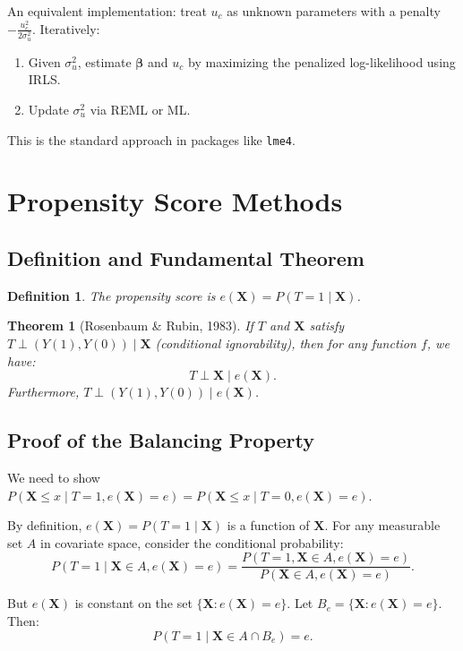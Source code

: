\documentclass[12pt]{article}
\numberwithin{equation}{section}
\newtheorem{theorem}{Theorem}[section]
\newtheorem{definition}{Definition}[section]
\begin{document}
	An equivalent implementation: treat $u_c$ as unknown parameters with a penalty $-\frac{u_c^2}{2\sigma_u^2}$. Iteratively:
	\begin{enumerate}
		\item Given $\sigma_u^2$, estimate $\boldsymbol{\beta}$ and $u_c$ by maximizing the penalized log-likelihood using IRLS.
		\item Update $\sigma_u^2$ via REML or ML.
	\end{enumerate}
	
	This is the standard approach in packages like \texttt{lme4}.
	
	\section{Propensity Score Methods}
	
	\subsection{Definition and Fundamental Theorem}
	
	\begin{definition}
		The propensity score is $e(\mathbf{X}) = P(T=1 \mid \mathbf{X})$.
	\end{definition}
	
	\begin{theorem}[Rosenbaum \& Rubin, 1983]
		If $T$ and $\mathbf{X}$ satisfy $T \perp (Y(1), Y(0)) \mid \mathbf{X}$ (conditional ignorability), then for any function $f$, we have:
		\[
		T \perp \mathbf{X} \mid e(\mathbf{X}).
		\]
		Furthermore, $T \perp (Y(1), Y(0)) \mid e(\mathbf{X})$.
	\end{theorem}
	
	\subsection{Proof of the Balancing Property}
	
	We need to show $P(\mathbf{X} \le x \mid T=1, e(\mathbf{X})=e) = P(\mathbf{X} \le x \mid T=0, e(\mathbf{X})=e)$.
	
	By definition, $e(\mathbf{X}) = P(T=1 \mid \mathbf{X})$ is a function of $\mathbf{X}$. For any measurable set $A$ in covariate space, consider the conditional probability:
	\[
	P(T=1 \mid \mathbf{X} \in A, e(\mathbf{X})=e) = \frac{P(T=1, \mathbf{X} \in A, e(\mathbf{X})=e)}{P(\mathbf{X} \in A, e(\mathbf{X})=e)}.
	\]
	
	But $e(\mathbf{X})$ is constant on the set $\{\mathbf{X}: e(\mathbf{X}) = e\}$. Let $B_e = \{\mathbf{X}: e(\mathbf{X}) = e\}$. Then:
	\[
	P(T=1 \mid \mathbf{X} \in A \cap B_e) = e.
	\]
	
\end{document}
